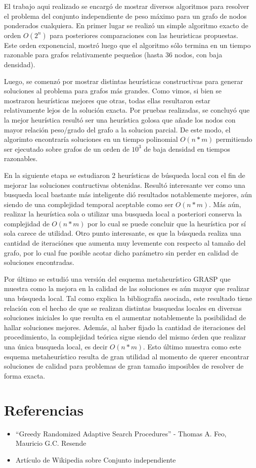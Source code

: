\documentclass[a4paper,11pt] {article}
\begin{document}
El trabajo aqui realizado se encargó de mostrar diversos algoritmos para resolver el problema del conjunto independiente de peso máximo para un grafo de nodos ponderados cualquiera. En primer lugar se realizó un simple algoritmo exacto de orden $O(2^n)$ para posteriores comparaciones con las heuristicas propuestas. Este orden exponencial, mostró luego que el algoritmo sólo termina en un tiempo razonable para grafos relativamente pequeños (hasta 36 nodos, con baja densidad). 

Luego, se comenzó por mostrar distintas heurísticas constructivas para generar soluciones al problema para grafos más grandes. Como vimos, si bien se mostraron heurísticas mejores que otras, todas ellas resultaron estar relativamente lejos de la solución exacta. Por pruebas realizadas, se concluyó que la mejor heurística resultó ser una heurística golosa que añade los nodos con mayor relación peso/grado del grafo a la solucion parcial. De este modo, el algorimto encontraría soluciones en un tiempo polinomial $O(n*m)$ permitiendo ser ejecutado sobre grafos de un orden de $10^3$ de baja densidad en tiempos razonables.

En la siguiente etapa se estudiaron 2 heurísticas de búsqueda local con el fin de mejorar las soluciones contructivas obtenidas. Resultó interesante ver como una busqueda local bastante más inteligente dió resultados notablemente mejores, aún siendo de una complejidad temporal aceptable como ser $O(n*m)$. Más aún, realizar la heurística sola o utilizar una busqueda local a posteriori conserva la complejidad de $O(n*m)$ por lo cual se puede concluir que la heurística por sí sola carece de utilidad. Otro punto interesante, es que la búsqueda realiza una cantidad de iteraciónes que aumenta muy levemente con respecto al tamaño del grafo, por lo cual fue posible acotar dicho parámetro sin perder en calidad de soluciones encontradas.

Por último se estudió una versión del esquema metaheurístico GRASP que muestra como la mejora en la calidad de las soluciones es aún mayor que realizar una búsqueda local. Tal como explica la bibliografía asociada, este resultado tiene relación con el hecho de que se realizan distintas busquedas locales en diversas soluciones iniciales lo que resulta en el aumentar notablemente la posibilidad de hallar soluciones mejores. Además, al haber fijado la cantidad de iteraciones del procedimiento, la complejidad teórica sigue siendo del mismo órden que realizar una única busqueda local, es decir $O(n*m)$. Esto último muestra como este esquema metaheurístico resulta de gran utilidad al momento de querer encontrar soluciones de calidad para problemas de gran tamaño imposibles de resolver de forma exacta.

\section*{Referencias}
\begin{itemize}
 \item ``Greedy Randomized Adaptive Search Procedures'' - Thomas A. Feo, Mauricio G.C. Resende
 \item Art\'iculo de Wikipedia sobre Conjunto independiente
\end{itemize}
\end{document}
